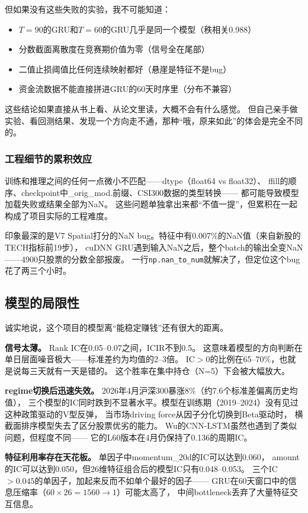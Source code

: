 \documentclass[12pt,a4paper]{ctexart}
\begin{document}
但如果没有这些失败的实验，我不可能知道：
\begin{itemize}[leftmargin=*]
    \item $T=90$的GRU和$T=60$的GRU几乎是同一个模型（秩相关0.988）
    \item 分数截面离散度在竞赛期价值为零（信号全在尾部）
    \item 二值止损阈值比任何连续映射都好（悬崖是特征不是bug）
    \item 资金流数据不能直接拼进GRU的60天时序里（分布不兼容）
\end{itemize}

这些结论如果直接从书上看、从论文里读，大概不会有什么感觉。
但自己亲手做实验、看回测结果、发现一个方向走不通，那种“哦，原来如此”的体会是完全不同的。

\subsubsection{工程细节的累积效应}

训练和推理之间的任何一点微小不匹配——dtype（float64 vs float32）、
ffill的顺序、checkpoint中\_orig\_mod.前缀、CSI300数据的类型转换——
都可能导致模型加载失败或结果全部为NaN。
这些问题单独拿出来都“不值一提”，但累积在一起构成了项目实际的工程难度。

印象最深的是V7 Spatial打分的NaN bug。特征中有0.007\%的NaN值（来自新股的TECH指标前19步），
cuDNN GRU遇到输入NaN之后，整个batch的输出全变NaN——4900只股票的分数全部报废。
一行\verb|np.nan_to_num|就解决了，但定位这个bug花了两三个小时。

\subsection{模型的局限性}

诚实地说，这个项目的模型离“能稳定赚钱”还有很大的距离。

\textbf{信号太薄。} Rank IC在0.05--0.07之间，ICIR不到0.5。
这意味着模型的方向判断在单日层面噪音极大——标准差约为均值的2--3倍。
IC$>0$的比例在65--70\%，也就是说每三天就有一天是错的。
这个胜率在集中持仓（N=5）下会被大幅放大。

\textbf{regime切换后迅速失效。} 2026年4月沪深300暴涨8\%（约7.6个标准差偏离历史均值），
三个模型的IC同时跌到不显著水平。模型在训练期（2019--2024）没有见过这种政策驱动的V型反弹，
当市场driving force从因子分化切换到Beta驱动时，
横截面排序模型失去了区分股票优劣的能力。
Wu的CNN-LSTM虽然也遇到了类似问题，但程度不同——
它的L60版本在4月仍保持了0.136的周期IC。

\textbf{特征利用率存在天花板。} 单因子中momentum\_20d的IC可以达到0.060，
amount的IC可以达到0.050，但26维特征组合后的模型IC只有0.048--0.053。
三个IC$>0.045$的单因子，加起来反而不如单个最好的因子——
GRU在60天窗口中的信息压缩率（$60\times26=1560\to1$）可能太高了，
中间bottleneck丢弃了大量特征交互信息。
\end{document}
